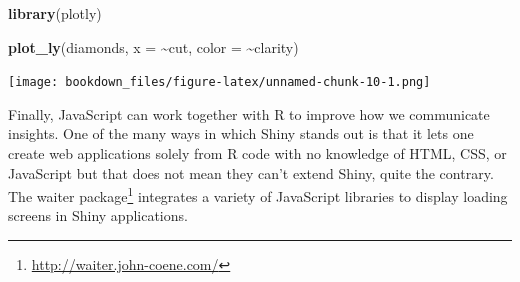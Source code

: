\documentclass[
]{krantz}
\makeatletter
\newenvironment{Shaded}{\begin{snugshade}}{\end{snugshade}}
\newcommand{\CommentTok}[1]{\textcolor[rgb]{0.37,0.37,0.37}{\textit{#1}}}
\newcommand{\ControlFlowTok}[1]{\textcolor[rgb]{0.27,0.27,0.27}{\textbf{#1}}}
\newcommand{\DataTypeTok}[1]{\textcolor[rgb]{0.27,0.27,0.27}{#1}}
\newcommand{\DecValTok}[1]{\textcolor[rgb]{0.06,0.06,0.06}{#1}}
\newcommand{\KeywordTok}[1]{\textcolor[rgb]{0.27,0.27,0.27}{\textbf{#1}}}
\newcommand{\NormalTok}[1]{#1}
\newcommand{\OperatorTok}[1]{\textcolor[rgb]{0.43,0.43,0.43}{\textbf{#1}}}
\newcommand{\StringTok}[1]{\textcolor[rgb]{0.5,0.5,0.5}{#1}}
\renewcommand{\href}[2]{#2\footnote{\url{#1}}}
\newenvironment{kframe}{%
\medskip{}
\setlength{\fboxsep}{.8em}
 \def\at@end@of@kframe{}%
 \ifinner\ifhmode%
  \def\at@end@of@kframe{\end{minipage}}%
  \begin{minipage}{\columnwidth}%
 \fi\fi%
 \def\FrameCommand##1{\hskip\@totalleftmargin \hskip-\fboxsep
 \colorbox{shadecolor}{##1}\hskip-\fboxsep
     \hskip-\linewidth \hskip-\@totalleftmargin \hskip\columnwidth}%
 \MakeFramed {\advance\hsize-\width
   \@totalleftmargin\z@ \linewidth\hsize
   \@setminipage}}%
 {\par\unskip\endMakeFramed%
 \at@end@of@kframe}
\renewenvironment{Shaded}{\begin{kframe}}{\end{kframe}}
\makeatother
\begin{document}
\begin{Shaded}
\begin{Highlighting}[]
\KeywordTok{library}\NormalTok{(plotly)}

\KeywordTok{plot\_ly}\NormalTok{(diamonds, }\DataTypeTok{x =} \OperatorTok{\textasciitilde{}}\NormalTok{cut, }\DataTypeTok{color =} \OperatorTok{\textasciitilde{}}\NormalTok{clarity)}
\end{Highlighting}
\end{Shaded}

\texttt{[image: bookdown\_files/figure-latex/unnamed-chunk-10-1.png]}

Finally, JavaScript can work together with R to improve how we communicate insights. One of the many ways in which Shiny stands out is that it lets one create web applications solely from R code with no knowledge of HTML, CSS, or JavaScript but that does not mean they can't extend Shiny, quite the contrary. The \href{http://waiter.john-coene.com/}{waiter package} \citep{R-waiter} integrates a variety of JavaScript libraries to display loading screens in Shiny applications.

\begin{Shaded}
\end{Shaded}
\end{document}
